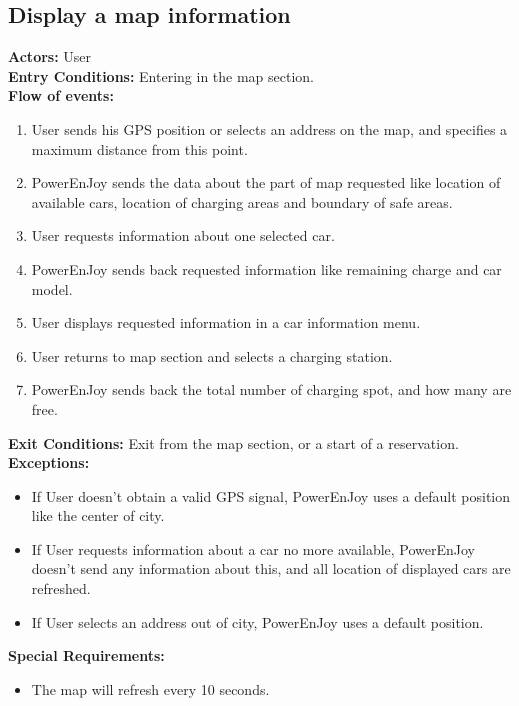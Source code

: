 


\subsection{Display a map information}
%
\textbf{Actors:}
User\\
%
\textbf{Entry Conditions:}
Entering in the map section. \\
%
\textbf{Flow of events:}
\begin{enumerate}
\item User sends his GPS position or selects an address on the map, and specifies a maximum distance from this point.
\item PowerEnJoy sends the data about the part of map requested like location of available cars, location of charging areas and boundary of safe areas. %
\item User requests information about one selected car.
\item PowerEnJoy sends back requested information like remaining charge and car model.
\item User displays requested information in a car information menu.
\item User returns to map section and selects a charging station.
\item PowerEnJoy sends back the total number of charging spot, and how many are free.
\end{enumerate}
%
\textbf{Exit Conditions:}
Exit from the map section, or a start of a reservation. \\
%
\textbf{Exceptions:}
\begin{itemize}
\item If User doesn't obtain a valid GPS signal, PowerEnJoy uses a default position like the center of city.
\item If User requests information about a car no more available, PowerEnJoy doesn't send any information about this, and all location of displayed cars are refreshed. 
\item If User selects an address out of city, PowerEnJoy uses a default position.
\end{itemize}
%
\textbf{Special Requirements:}
\begin{itemize}
\item The map will refresh every 10 seconds.
\end{itemize}


